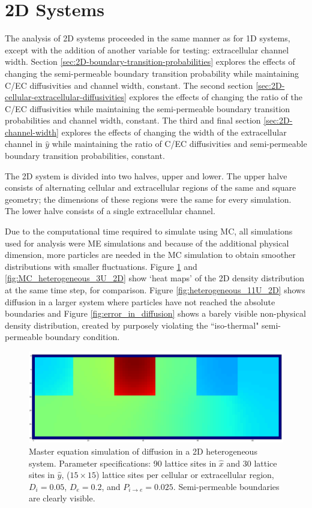 \clearpage
\section{2D Systems}
\label{sec:ra-2D}
	The analysis of 2D systems proceeded in the same manner as for 1D systems, except with the addition of another variable for testing: extracellular channel width. Section \ref{sec:2D-boundary-transition-probabilities} explores the effects of changing the semi-permeable boundary transition probability while maintaining C/EC diffusivities and channel width, constant. The second section \ref{sec:2D-cellular-extracellular-diffusivities} explores the effects of changing the ratio of the C/EC diffusivities while maintaining the semi-permeable boundary transition probabilities and channel width, constant. The third and final section \ref{sec:2D-channel-width} explores the effects of changing the width of the extracellular channel in $ \hat{y} $ while maintaining the ratio of C/EC diffusivities and semi-permeable boundary transition probabilities, constant.
	
	The 2D system is divided into two halves, upper and lower. The upper halve consists of alternating cellular and extracellular regions of the same and square geometry; the dimensions of these regions were the same for every simulation. The lower halve consists of a single extracellular channel.
	
	Due to the computational time required to simulate using MC, all simulations used for analysis were ME simulations and because of the additional physical dimension, more particles are needed in the MC simulation to obtain smoother distributions with smaller fluctuations. Figure \ref{fig:heterogeneous_3U_2D} and \ref{fig:MC_heterogeneous_3U_2D} show `heat maps' of the 2D density distribution at the same time step, for comparison. Figure \ref{fig:heterogeneous_11U_2D} shows diffusion in a larger system where particles have not reached the absolute boundaries and Figure \ref{fig:error_in_diffusion} shows a barely visible non-physical density distribution, created by purposely violating the ``iso-thermal" semi-permeable boundary condition.
	
	\begin{figure}[h]
		\centering
		\includegraphics[width=1.0\linewidth]{../images/2D/heterogeneous_3U_2D}
		\caption{Master equation simulation of diffusion in a 2D heterogeneous system. Parameter specifications: 90 lattice sites in $ \hat{x} $ and 30 lattice sites in $ \hat{y} $, ($ 15 \times 15 $) lattice sites per cellular or extracellular region, $ D_i = 0.05 $, $ D_e = 0.2 $, and $ P_{i\rightarrow e} = 0.025 $. Semi-permeable boundaries are clearly visible.}
		\label{fig:heterogeneous_3U_2D}
	\end{figure}
	
